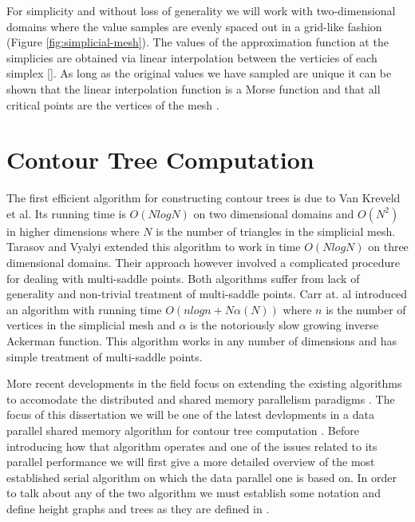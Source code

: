 For simplicity and without loss of generality we will work with two-dimensional domains where the value samples are evenly spaced out in a grid-like fashion (Figure \ref{fig:simplicial-mesh}). The values of the approximation function at the simplicies are obtained via linear interpolation between the verticies of each simplex []. As long as the original values we have sampled are unique it can be shown that the linear interpolation function is a Morse function and that all critical points are the vertices of the mesh \cite{curvature-embeded-polyhedra}.

\section{Contour Tree Computation}



The first efficient algorithm for constructing contour trees \cite{first-ct-algo} is due to Van Kreveld et al. Its running time is $O(NlogN)$ on two dimensional domains and $O(N^2)$ in higher dimensions where $N$ is the number of triangles in the simplicial mesh. Tarasov and Vyalyi \cite{second-ct-algo} extended this algorithm to work in time $O(NlogN)$ on three dimensional domains. Their approach however involved a complicated procedure for dealing with multi-saddle points. Both algorithms suffer from lack of generality and non-trivial treatment of multi-saddle points. Carr at. al \cite{ct-big-paper} introduced an algorithm with running time $O(nlogn + N\alpha(N))$ where $n$ is the number of vertices in the simplicial mesh and $\alpha$ is the notoriously slow growing inverse Ackerman function. This algorithm works in any number of dimensions and has simple treatment of multi-saddle points.

More recent developments in the field focus on extending the existing algorithms to accomodate the distributed \cite{distributed-ct-algo, distributed-ct-algo-2} and shared memory parallelism paradigms \cite{parallel-peak-pruning, parallel-ct-1}. The focus of this dissertation we will be one of the latest devlopments in a data parallel shared memory algorithm for contour tree computation
\cite{parallel-peak-pruning}. Before introducing how that algorithm operates and one of the issues related to its parallel performance we will first give a more detailed overview of the most established serial algorithm \cite{ct-big-paper} on which the data parallel one is based on. In order to talk about any of the two algorithm we must establish some notation and define height graphs and trees as they are defined in \cite{carr-masters}.

